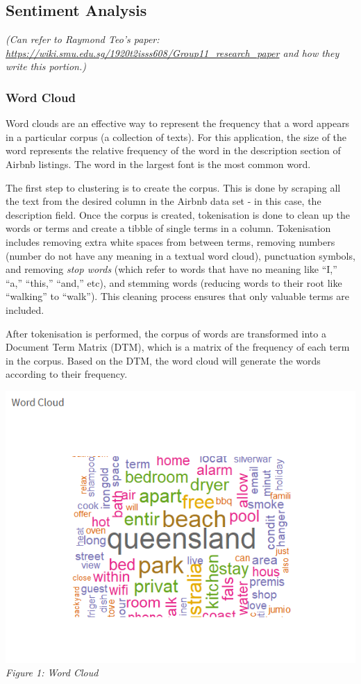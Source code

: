 \documentclass{acm_proc_article-sp}
\begin{document}
\hypertarget{sentiment-analysis}{%
\subsection{Sentiment Analysis}\label{sentiment-analysis}}

\emph{(Can refer to Raymond Teo's paper:
\url{https://wiki.smu.edu.sg/1920t2isss608/Group11_research_paper} and
how they write this portion.)}

\hypertarget{word-cloud}{%
\subsubsection{Word Cloud}\label{word-cloud}}

Word clouds are an effective way to represent the frequency that a word
appears in a particular corpus (a collection of texts). For this
application, the size of the word represents the relative frequency of
the word in the description section of Airbnb listings. The word in the
largest font is the most common word.

The first step to clustering is to create the corpus. This is done by
scraping all the text from the desired column in the Airbnb data set -
in this case, the description field. Once the corpus is created,
tokenisation is done to clean up the words or terms and create a tibble
of single terms in a column. Tokenisation includes removing extra white
spaces from between terms, removing numbers (number do not have any
meaning in a textual word cloud), punctuation symbols, and removing
\emph{stop words} (which refer to words that have no meaning like ``I,''
``a,'' ``this,'' ``and,'' etc), and stemming words (reducing words to
their root like ``walking'' to ``walk''). This cleaning process ensures
that only valuable terms are included.

After tokenisation is performed, the corpus of words are transformed
into a Document Term Matrix (DTM), which is a matrix of the frequency of
each term in the corpus. Based on the DTM, the word cloud will generate
the words according to their frequency.

\includegraphics{images/wordcloud1.png} \emph{Figure 1: Word Cloud}
\end{document}
